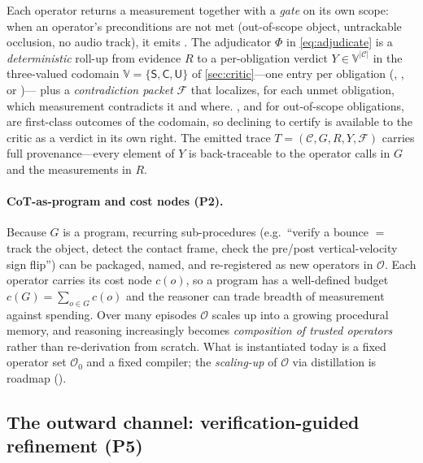 Each operator returns a measurement together with a \emph{gate} on its own scope:
when an operator's preconditions are not met (out-of-scope object, untrackable
occlusion, no audio track), it emits \abstain{}.
The adjudicator $\Phi$ in \eqref{eq:adjudicate} is a \emph{deterministic} roll-up
from evidence $R$ to a per-obligation verdict $Y\in\mathbb{V}^{|\mathcal{C}|}$ in the three-valued
codomain $\mathbb{V}=\{\mathsf{S},\mathsf{C},\mathsf{U}\}$ of \cref{sec:critic}---one entry per
obligation (\supported{}, \contradicted{}, or \unknownv{})---%
plus a \emph{contradiction packet} $\mathcal{F}$ that localizes, for each unmet obligation,
which measurement contradicts it and where. \unknownv{}, and \abstain{} for out-of-scope
obligations, are first-class outcomes of the codomain, so declining to certify is available to
the critic as a verdict in its own right. The
emitted trace $T=(\mathcal{C},G,R,Y,\mathcal{F})$ carries full provenance---every element of $Y$ is
back-traceable to the operator calls in $G$ and the measurements in $R$.

\paragraph{CoT-as-program and cost nodes \textnormal{(P2)}.} Because $G$ is a
program, recurring sub-procedures (e.g.\ ``verify a bounce $=$ track the object,
detect the contact frame, check the pre/post vertical-velocity sign flip'') can
be packaged, named, and re-registered as new operators in $\mathcal{O}$. Each operator
carries its cost node $c(o)$, so a program has a well-defined budget
$c(G)=\sum_{o\in G} c(o)$ and the reasoner can trade breadth of measurement
against spending. Over many episodes $\mathcal{O}$ scales up into a growing procedural
memory, and reasoning increasingly becomes \emph{composition of trusted
operators} rather than re-derivation from scratch. What is instantiated today is
a fixed operator set $\mathcal{O}_0$ and a fixed compiler; the \emph{scaling-up} of $\mathcal{O}$
via distillation is roadmap ().

\subsection{The outward channel: verification-guided refinement \textnormal{(P5)}}
\label{sec:framework:control}

